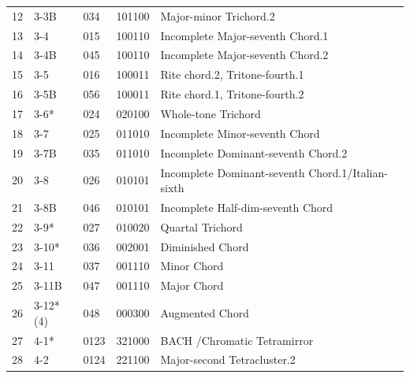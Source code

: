 \documentclass[
	12pt,				%
	openright,			%
	twoside,			%
	a4paper,			%
	english,			%
	french,				%
	spanish,			%
	brazil				%
	]{abntex2}
\begin{document}
\begin{anexosenv}
\begin{table}[h]
\begin{tabular}{lllll}
12 & 3-3B                           & 034   & 101100          & Major-minor Trichord.2                            \\
13 & 3-4                            & 015   & 100110          & Incomplete Major-seventh Chord.1                  \\
14 & 3-4B                           & 045   & 100110          & Incomplete Major-seventh Chord.2                  \\
15 & 3-5                            & 016   & 100011          & Rite chord.2, Tritone-fourth.1                    \\
16 & 3-5B                           & 056   & 100011          & Rite chord.1, Tritone-fourth.2                    \\
17 & 3-6*                           & 024   & 020100          & Whole-tone Trichord                               \\
18 & 3-7                            & 025   & 011010          & Incomplete Minor-seventh Chord                    \\
19 & 3-7B                           & 035   & 011010          & Incomplete Dominant-seventh Chord.2               \\
20 & 3-8                            & 026   & 010101          & Incomplete Dominant-seventh Chord.1/Italian-sixth \\
21 & 3-8B                           & 046   & 010101          & Incomplete Half-dim-seventh Chord                 \\
22 & 3-9*                           & 027   & 010020          & Quartal Trichord                                  \\
23 & 3-10*                          & 036   & 002001          & Diminished Chord                                  \\
24 & 3-11                           & 037   & 001110          & Minor Chord                                       \\
25 & 3-11B                          & 047   & 001110          & Major Chord                                       \\
26 & 3-12*(4)                       & 048   & 000300          & Augmented Chord                                   \\
27 & 4-1*                           & 0123  & 321000          & BACH /Chromatic Tetramirror                       \\
28 & 4-2                            & 0124  & 221100          & Major-second Tetracluster.2                       \\

\end{tabular}
\end{table}
\end{anexosenv}
\end{document}

